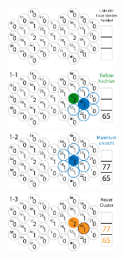 \documentclass[10pt]{beamer}
\begin{document}
\begin{frame}
	\includegraphics*[width=3.7cm]{media/cluster/cfd000.png} \\
	\includegraphics*[width=3.7cm]{media/cluster/cfd001.png} \\
	\includegraphics*[width=3.7cm]{media/cluster/cfd002.png} \\
	\includegraphics*[width=3.7cm]{media/cluster/cfd003.png}
\end{frame}
\end{document}
